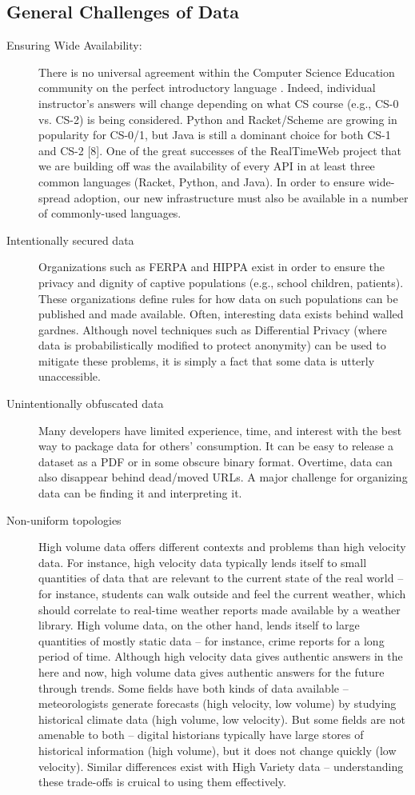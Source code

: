 \subsection{General Challenges of Data}

\begin{description}
	\item[Ensuring Wide Availability:] There is no universal agreement within the Computer Science Education community
on the perfect introductory language \cite{CS2013}. Indeed, individual instructor’s answers will change
depending on what CS course (e.g., CS-0 vs. CS-2) is being considered. Python and Racket/Scheme are growing in
popularity for CS-0/1, but Java is still a dominant choice for both CS-1 and CS-2 [8]. One of the great
successes of the RealTimeWeb project that we are building off was the availability of every API in at
least three common languages (Racket, Python, and Java). In order to ensure wide-spread adoption, our
new infrastructure must also be available in a number of commonly-used languages.
\item[Intentionally secured data] Organizations such as FERPA and HIPPA exist in order to ensure the privacy and dignity of captive populations (e.g., school children, patients). These organizations define rules for how data on such populations can be published and made available. Often, interesting data exists behind walled gardnes. Although novel techniques such as Differential Privacy (where data is probabilistically modified to protect anonymity) can be used to mitigate these problems, it is simply a fact that some data is utterly unaccessible.
\item[Unintentionally obfuscated data] Many developers have limited experience, time, and interest with the best way to package data for others' consumption. It can be easy to release a dataset as a PDF or in some obscure binary format. Overtime, data can also disappear behind dead/moved URLs. A major challenge for organizing data can be finding it and interpreting it.
\item[Non-uniform topologies] High volume data offers different contexts and problems than high velocity data.
For instance, high velocity data typically lends itself to small quantities of data that are relevant to the current state of the real world -- for instance, students can walk outside and feel the current weather, which should correlate to real-time weather reports made available by a weather library.
High volume data, on the other hand, lends itself to large quantities of mostly static data -- for instance, crime reports for a long period of time.
Although high velocity data gives authentic answers in the here and now, high volume data gives authentic answers for the future through trends.
Some fields have both kinds of data available -- meteorologists generate forecasts (high velocity, low volume) by studying historical climate data (high volume, low velocity).
But some fields are not amenable to both -- digital historians typically have large stores of historical information (high volume), but it does not change quickly (low velocity).
Similar differences exist with High Variety data -- understanding these trade-offs is cruical to using them effectively.
\end{description}

